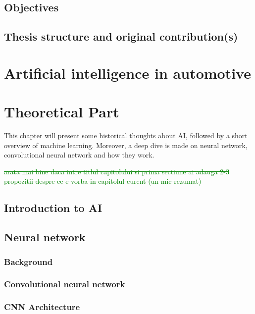 \documentclass{article}
\begin{document}
    \subsection{Objectives}
        
    \subsection{Thesis structure and original contribution(s)}
        

\newpage
\section{Artificial intelligence in automotive}
    
\newpage
\section{Theoretical Part}

This chapter will present some historical thoughts about AI, followed by a short overview of machine learning. Moreover, a deep dive is made on neural network, convolutional neural network and how they work.

\textcolor{green}{\sout{arata mai bine daca intre titlul capitolului si prima sectiune ai adauga 2-3 propozitii despre ce e vorba in capitolul curent (un mic rezumat)}}

    \subsection{Introduction to AI}
        
    \subsection{Neural network}
        \subsubsection{Background}
            
        \subsubsection{Convolutional neural network}            
        
        \subsubsection{CNN Architecture}
        
    
\end{document}
